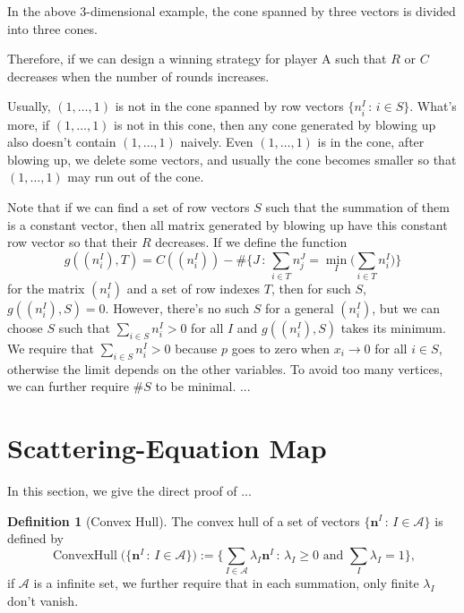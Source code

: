 \documentclass[12pt]{article}
\theoremstyle{definition}
\newtheorem{defi}[para]{Definition}
\theoremstyle{plain}
\begin{document}
\begin{enumerate}
\begin{center}
	\end{center}
	In the above 3-dimensional example, the cone spanned by three vectors is divided into 
	three cones.
\end{enumerate}

Therefore, if we can 
design a winning strategy for player A such that $R$ or $C$ decreases when the number of rounds
increases. 


Usually, $(1,\dots,1)$ is not in the cone spanned by row vectors $\{n_i^I\,:\,i\in S\}$. What's more,
if $(1,\dots,1)$ is not in this cone, then any cone generated
by blowing up also doesn't contain $(1,\dots,1)$ naively.
Even $(1,\dots,1)$ is in the cone, after blowing up, we delete some vectors, and usually the cone becomes
smaller so that $(1,\dots,1)$ may run out of the cone. 

Note that if we can find a set of row vectors $S$ such that the summation of them is
a constant vector, then all matrix generated by blowing up have this constant row vector so that
their $R$ decreases. If we define the function
\[
	g((n^I_i),T)=C((n^I_i))-\#\biggl\{J\,:\, \sum_{i\in T} n^J_j=
	\min_I \biggl(\sum_{i\in T} n^I_i\biggr)\biggr\}
\]
for the matrix $(n^I_i)$ and a set of row indexes $T$, then for such $S$, $g((n^I_i),S)=0$.
However, there's no such $S$ for a general $(n^I_i)$, but we can choose $S$  
such that $\sum_{i\in S} n_i^I>0$ for all $I$ and 
$g((n^I_i),S)$ takes its minimum. We require that $\sum_{i\in S} n_i^I>0$ because $p$
goes to zero when $x_i\to 0$ for all $i \in S$, otherwise the limit depends on the 
other variables.
To avoid too many vertices, we can further require $\#S$ to be minimal. 
...

\section{Scattering-Equation Map}

In this section, we give the direct proof of ...

\begin{defi}[Convex Hull]
The convex hull of a set of vectors $\{\mathbf n^I\,:\, I\in \mathscr A\}$ is defined by
\[
	\operatorname{ConvexHull}\bigl(\{\mathbf n^I\,:\, I\in \mathscr A\}\bigr)
	:=\Biggl\{\sum_{I\in\mathscr A}\lambda_I \mathbf n^I\,:\,
	\text{$\lambda_I\geq 0$ and $\sum_I\lambda_I=1$}\Biggr\},
\]
if $\mathscr A$ is a infinite set, we further require that in each summation, 
only finite $\lambda_I$ don't vanish.
\end{defi}
\end{document}
